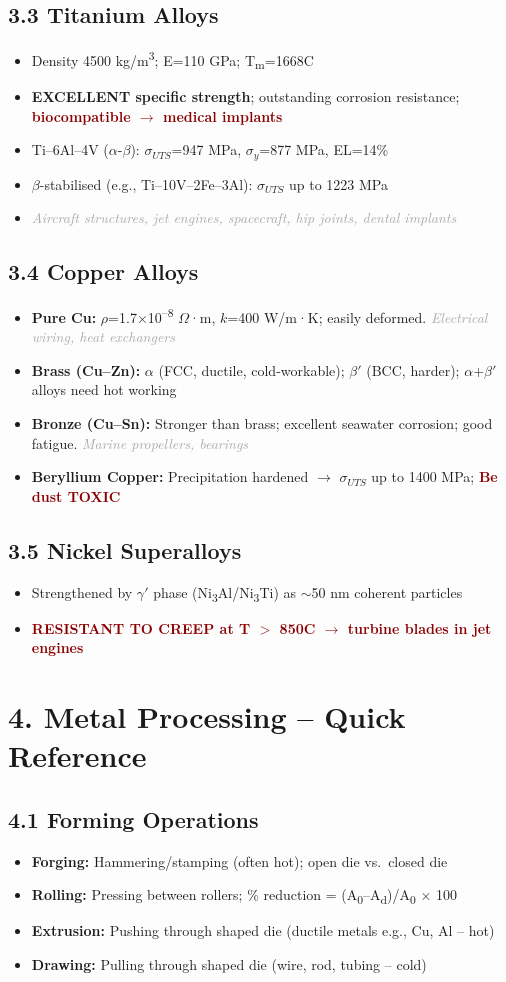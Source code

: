 \documentclass[11pt,a4paper]{article}
\newcommand{\mysec}[1]{\section*{#1}}
\newcommand{\mysubsec}[1]{\subsection*{#1}}
\newcommand{\CRIT}[1]{\textcolor{DarkRed}{\textbf{#1}}}
\newcommand{\KEY}[1]{\textcolor{SecondaryDark}{\textbf{#1}}}
\newcommand{\EXA}[1]{\textcolor{DarkGray}{\textit{#1}}}
\newcommand{\HI}[1]{\colorbox{yellow!20}{\textcolor{DarkPurple}{\textbf{#1}}}}
\begin{document}
\mysubsec{3.3 Titanium Alloys}
\begin{itemize}[leftmargin=*,nosep]
    \item Density 4500 kg/m\textsuperscript{3}; E=110 GPa; T\textsubscript{m}=1668\textdegree C
    \item \HI{EXCELLENT specific strength}; outstanding corrosion resistance; \CRIT{biocompatible $\to$ medical implants}
    \item Ti--6Al--4V ($\alpha$-$\beta$): $\sigma_{UTS}$=947 MPa, $\sigma_y$=877 MPa, EL=14\%
    \item $\beta$-stabilised (e.g., Ti--10V--2Fe--3Al): $\sigma_{UTS}$ up to 1223 MPa
    \item \EXA{Aircraft structures, jet engines, spacecraft, hip joints, dental implants}
\end{itemize}

\mysubsec{3.4 Copper Alloys}
\begin{itemize}[leftmargin=*,nosep]
    \item \textbf{Pure Cu:} $\rho$=1.7$\times$10\textsuperscript{--8} $\Omega$·m, $k$=400 W/m·K; easily deformed. \EXA{Electrical wiring, heat exchangers}
    \item \textbf{Brass (Cu--Zn):} $\alpha$ (FCC, ductile, cold-workable); $\beta'$ (BCC, harder); $\alpha$+$\beta'$ alloys need hot working
    \item \textbf{Bronze (Cu--Sn):} Stronger than brass; excellent seawater corrosion; good fatigue. \EXA{Marine propellers, bearings}
    \item \textbf{Beryllium Copper:} Precipitation hardened $\to$ $\sigma_{UTS}$ up to 1400 MPa; \CRIT{Be dust TOXIC}
\end{itemize}

\mysubsec{3.5 Nickel Superalloys}
\begin{itemize}[leftmargin=*,nosep]
    \item Strengthened by $\gamma'$ phase (Ni\textsubscript{3}Al/Ni\textsubscript{3}Ti) as $\sim$50 nm coherent particles
    \item \CRIT{RESISTANT TO CREEP at T $>$ 850\textdegree C $\to$ turbine blades in jet engines}
\end{itemize}

\newpage
\mysec{4. Metal Processing -- Quick Reference}

\mysubsec{4.1 Forming Operations}
\begin{itemize}[leftmargin=*,nosep]
    \item \KEY{Forging:} Hammering/stamping (often hot); open die vs.\ closed die
    \item \KEY{Rolling:} Pressing between rollers; \% reduction = (A\textsubscript{0}--A\textsubscript{d})/A\textsubscript{0} $\times$ 100
    \item \KEY{Extrusion:} Pushing through shaped die (ductile metals e.g., Cu, Al -- hot)
    \item \KEY{Drawing:} Pulling through shaped die (wire, rod, tubing -- cold)
\end{itemize}
\end{document}

